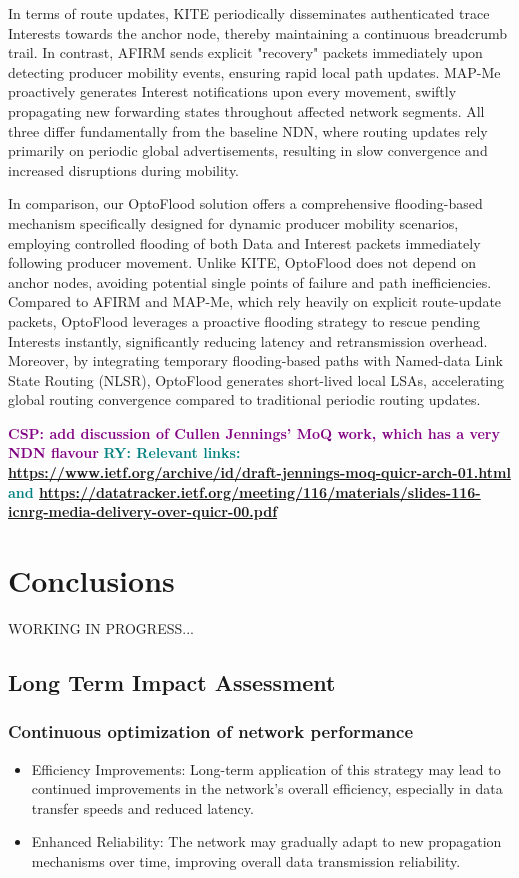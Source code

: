 \documentclass[10pt,conference]{IEEEtran}
\newcommand{\csp}[1]{\textbf{\textcolor{purple}{CSP: #1}}}
\newcommand{\ryo}[1]{\textbf{\textcolor{teal}{RY: #1}}}
\begin{document}
In terms of route updates, KITE periodically disseminates authenticated trace Interests towards the anchor node, thereby maintaining a continuous breadcrumb trail. In contrast, AFIRM sends explicit "recovery" packets immediately upon detecting producer mobility events, ensuring rapid local path updates. MAP-Me proactively generates Interest notifications upon every movement, swiftly propagating new forwarding states throughout affected network segments. All three differ fundamentally from the baseline NDN, where routing updates rely primarily on periodic global advertisements, resulting in slow convergence and increased disruptions during mobility.

In comparison, our OptoFlood solution offers a comprehensive flooding-based mechanism specifically designed for dynamic producer mobility scenarios, employing controlled flooding of both Data and Interest packets immediately following producer movement. Unlike KITE, OptoFlood does not depend on anchor nodes, avoiding potential single points of failure and path inefficiencies. Compared to AFIRM and MAP-Me, which rely heavily on explicit route-update packets, OptoFlood leverages a proactive flooding strategy to rescue pending Interests instantly, significantly reducing latency and retransmission overhead. Moreover, by integrating temporary flooding-based paths with Named-data Link State Routing (NLSR), OptoFlood generates short-lived local LSAs, accelerating global routing convergence compared to traditional periodic routing updates.

\csp{add discussion of Cullen Jennings' MoQ work, which has a very NDN flavour}
\ryo{Relevant links: \url{https://www.ietf.org/archive/id/draft-jennings-moq-quicr-arch-01.html} and \url{https://datatracker.ietf.org/meeting/116/materials/slides-116-icnrg-media-delivery-over-quicr-00.pdf}}

\section{Conclusions}
\label{sec:conclusion}

WORKING IN PROGRESS...
\subsection{Long Term Impact Assessment}
\subsubsection{Continuous optimization of network performance}
\begin{itemize}
    \item Efficiency Improvements: Long-term application of this strategy may lead to continued improvements in the network's overall efficiency, especially in data transfer speeds and reduced latency.
    \item Enhanced Reliability: The network may gradually adapt to new propagation mechanisms over time, improving overall data transmission reliability.
\end{itemize}
\end{document}
